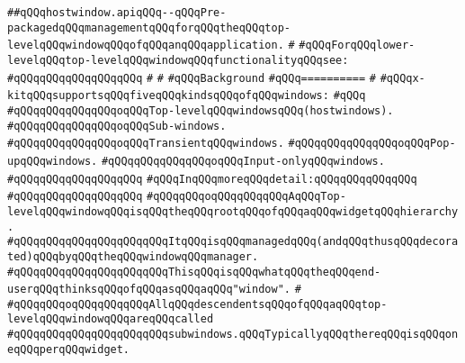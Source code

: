 \label{src/lib/x-kit/widget/old/basic/hostwindow.api}
\verb|##qQQqhostwindow.apiqQQq--qQQqPre-packagedqQQqmanagementqQQqforqQQqtheqQQqtop-levelqQQqwindowqQQqofqQQqanqQQqapplication.|\newline
\verb|#|\newline
\verb|#qQQqForqQQqlower-levelqQQqtop-levelqQQqwindowqQQqfunctionalityqQQqsee:|\newline
\verb|#qQQqqQQqqQQqqQQqqQQq|\newline
\verb|#|\newline
\verb|#|\newline
\verb|#qQQqBackground|\newline
\verb|#qQQq==========|\newline
\verb|#|\newline
\verb|#qQQqx-kitqQQqsupportsqQQqfiveqQQqkindsqQQqofqQQqwindows:|\newline
\verb|#qQQq|\newline
\verb|#qQQqqQQqqQQqqQQqoqQQqTop-levelqQQqwindowsqQQq(hostwindows).|\newline
\verb|#qQQqqQQqqQQqqQQqoqQQqSub-windows.|\newline
\verb|#qQQqqQQqqQQqqQQqoqQQqTransientqQQqwindows.|\newline
\verb|#qQQqqQQqqQQqqQQqoqQQqPop-upqQQqwindows.|\newline
\verb|#qQQqqQQqqQQqqQQqoqQQqInput-onlyqQQqwindows.|\newline
\verb|#qQQqqQQqqQQqqQQqqQQq|\newline
\verb|#qQQqInqQQqmoreqQQqdetail:qQQqqQQqqQQqqQQq|\newline
\verb|#qQQqqQQqqQQqqQQqqQQq|\newline
\verb|#qQQqqQQqoqQQqqQQqqQQqAqQQqTop-levelqQQqwindowqQQqisqQQqtheqQQqrootqQQqofqQQqaqQQqwidgetqQQqhierarchy.|\newline
\verb|#qQQqqQQqqQQqqQQqqQQqqQQqItqQQqisqQQqmanagedqQQq(andqQQqthusqQQqdecorated)qQQqbyqQQqtheqQQqwindowqQQqmanager.|\newline
\verb|#qQQqqQQqqQQqqQQqqQQqqQQqThisqQQqisqQQqwhatqQQqtheqQQqend-userqQQqthinksqQQqofqQQqasqQQqaqQQq"window".|\newline
\verb|#|\newline
\verb|#qQQqqQQqoqQQqqQQqqQQqAllqQQqdescendentsqQQqofqQQqaqQQqtop-levelqQQqwindowqQQqareqQQqcalled|\newline
\verb|#qQQqqQQqqQQqqQQqqQQqqQQqsubwindows.qQQqTypicallyqQQqthereqQQqisqQQqoneqQQqperqQQqwidget.|\newline
